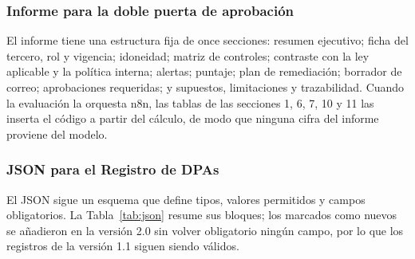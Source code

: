 \documentclass[12pt,letterpaper]{article}
\begin{document}
\subsubsection{Informe para la doble puerta de aprobación}

El informe tiene una estructura fija de once secciones: resumen ejecutivo; ficha del tercero, rol y vigencia; idoneidad; matriz de controles; contraste con la ley aplicable y la política interna; alertas; puntaje; plan de remediación; borrador de correo; aprobaciones requeridas; y supuestos, limitaciones y trazabilidad. Cuando la evaluación la orquesta n8n, las tablas de las secciones 1, 6, 7, 10 y 11 las inserta el código a partir del cálculo, de modo que ninguna cifra del informe proviene del modelo.

\subsubsection{JSON para el Registro de DPAs}

El JSON sigue un esquema que define tipos, valores permitidos y campos obligatorios. La Tabla~\ref{tab:json} resume sus bloques; los marcados como nuevos se añadieron en la versión 2.0 sin volver obligatorio ningún campo, por lo que los registros de la versión 1.1 siguen siendo válidos.
\end{document}
